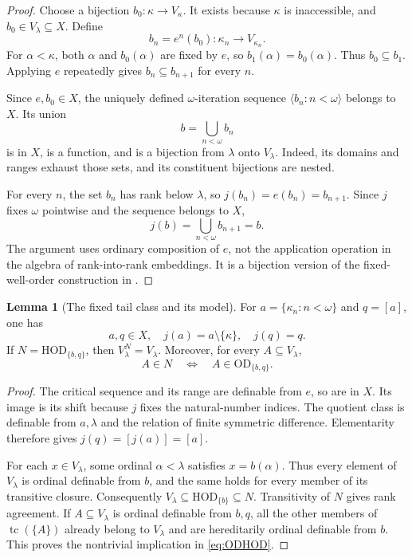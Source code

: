 \documentclass[11pt,letterpaper]{article}
\theoremstyle{definition}
\newtheorem{lemma}[definition]{Lemma}
\numberwithin{equation}{section}
\newcommand{\HOD}{\mathrm{HOD}}
\newcommand{\OD}{\mathrm{OD}}
\newcommand{\tc}{\operatorname{tc}}
\newcommand{\Ncore}{\HOD_{\{b,q\}}}
\begin{document}
\begin{proof}
Choose a bijection $b_0:\kappa\to V_\kappa$. It exists because $\kappa$ is inaccessible, and $b_0\in V_\lambda\subseteq X$. Define
\[
 b_n=e^n(b_0):\kappa_n\longrightarrow V_{\kappa_n}.
\]
For $\alpha<\kappa$, both $\alpha$ and $b_0(\alpha)$ are fixed by $e$, so $b_1(\alpha)=b_0(\alpha)$. Thus $b_0\subseteq b_1$. Applying $e$ repeatedly gives $b_n\subseteq b_{n+1}$ for every $n$.

Since $e,b_0\in X$, the uniquely defined $\omega$-iteration sequence $\langle b_n:n<\omega\rangle$ belongs to $X$. Its union
\[
 b=\bigcup_{n<\omega}b_n
\]
is in $X$, is a function, and is a bijection from $\lambda$ onto $V_\lambda$. Indeed, its domains and ranges exhaust those sets, and its constituent bijections are nested.

For every $n$, the set $b_n$ has rank below $\lambda$, so $j(b_n)=e(b_n)=b_{n+1}$. Since $j$ fixes $\omega$ pointwise and the sequence belongs to $X$,
\[
 j(b)=\bigcup_{n<\omega}b_{n+1}=b.
\]
The argument uses ordinary composition of $e$, not the application operation in the algebra of rank-into-rank embeddings. It is a bijection version of the fixed-well-order construction in \cite[proof of Proposition~3.9]{abgl}.
\end{proof}

\begin{lemma}[The fixed tail class and its model]\label{lem:q}
For $a=\{\kappa_n:n<\omega\}$ and $q=[a]$, one has
\[
 a,q\in X,\quad j(a)=a\setminus\{\kappa\},\quad j(q)=q.
\]
If $N=\Ncore$, then $V_\lambda^N=V_\lambda$. Moreover, for every $A\subseteq V_\lambda$,
\begin{equation}\label{eq:ODHOD}
 A\in N\quad\Longleftrightarrow\quad A\in\OD_{\{b,q\}}.
\end{equation}
\end{lemma}

\begin{proof}
The critical sequence and its range are definable from $e$, so are in $X$. Its image is its shift because $j$ fixes the natural-number indices. The quotient class is definable from $a,\lambda$ and the relation of finite symmetric difference. Elementarity therefore gives $j(q)=[j(a)]=[a]$.

For each $x\in V_\lambda$, some ordinal $\alpha<\lambda$ satisfies $x=b(\alpha)$. Thus every element of $V_\lambda$ is ordinal definable from $b$, and the same holds for every member of its transitive closure. Consequently $V_\lambda\subseteq\HOD_{\{b\}}\subseteq N$. Transitivity of $N$ gives rank agreement. If $A\subseteq V_\lambda$ is ordinal definable from $b,q$, all the other members of $\tc(\{A\})$ already belong to $V_\lambda$ and are hereditarily ordinal definable from $b$. This proves the nontrivial implication in \eqref{eq:ODHOD}.
\end{proof}
\end{document}
